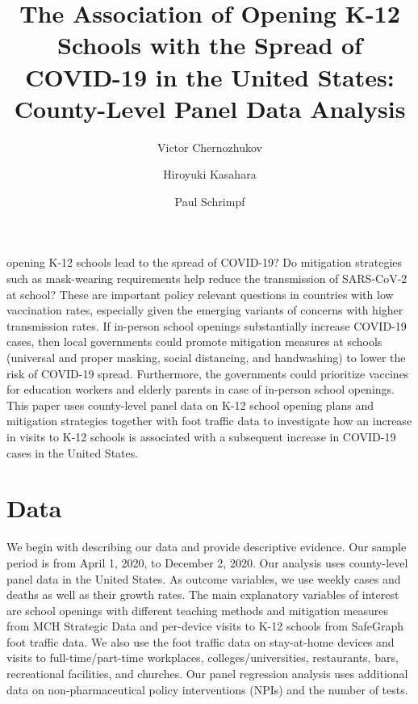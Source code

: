 \documentclass[9pt,twocolumn,twoside,lineno]{pnas-new}
\title{The Association of Opening K-12 Schools with the Spread of COVID-19 in the United States: County-Level Panel Data Analysis}
\author[a,1]{Victor Chernozhukov}
\author[b,2]{Hiroyuki Kasahara }
\author[b]{Paul Schrimpf}
\affil[a]{Department of Economics and Center for Statistics and Data Science, MIT}
\affil[b]{Vancouver School of Economics, University of British Columbia}
\begin{document}
\maketitle
\thispagestyle{firststyle}
 opening K-12 schools lead to the spread of COVID-19? Do mitigation strategies such as mask-wearing requirements help reduce the transmission of SARS-CoV-2  at school?  These are important policy relevant questions  in countries with low vaccination rates, especially given the emerging variants of concerns with higher transmission rates. If in-person school openings substantially increase  COVID-19 cases, then local governments could promote mitigation measures at schools (universal and proper masking, social distancing, and handwashing) to lower the risk of COVID-19 spread. %
Furthermore, the governments could prioritize vaccines for education workers and elderly parents in case of in-person school openings.  This paper uses county-level panel data on K-12 school opening plans and mitigation strategies together with foot traffic data to investigate how an increase in visits to K-12 schools is associated with a subsequent increase in COVID-19 cases in the United States.

\section*{Data} We begin with describing our data and provide descriptive evidence. Our sample period is from  April 1, 2020, to December 2, 2020.
Our analysis uses county-level panel data in the United States. As outcome variables, we use weekly cases and deaths as well as their growth rates. The main explanatory variables of interest are school openings with different teaching methods and mitigation measures from MCH Strategic Data and per-device visits to K-12 schools from SafeGraph foot traffic data. We also use the foot traffic data on stay-at-home devices and visits to full-time/part-time workplaces, colleges/universities, restaurants, bars, recreational facilities,  and churches. Our panel regression analysis uses additional data on non-pharmaceutical policy interventions (NPIs) and the number of tests.
\end{document}
